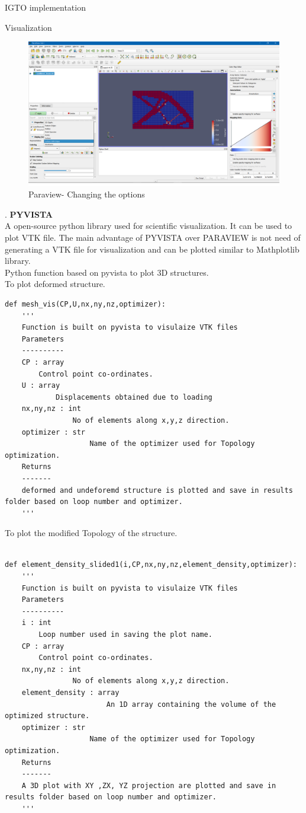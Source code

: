 \documentclass[a4paper,12pt,times]{article}
\begin{document}
\begin{section}{IGTO implementation}
\begin{subsection}{Visualization}
\begin{figure}[h!]
\centering
\includegraphics[width=0.75\linewidth]{paraview2.png}
\caption{ Paraview- Changing the options}
\label{fig:Paraview 2}
\end{figure}
.\textbf{ PYVISTA}\\
A open-source python library used for scientific visualization. It can be used to plot VTK file. The main advantage of PYVISTA over PARAVIEW is not need of generating a VTK file for visualization and can be plotted similar to Mathplotlib library.\\
Python function based on pyvista to plot 3D structures.\\
To plot deformed structure.
\begin{lstlisting}
def mesh_vis(CP,U,nx,ny,nz,optimizer):
    '''
    Function is built on pyvista to visulaize VTK files
    Parameters
    ----------
    CP : array
        Control point co-ordinates.
    U : array
            Displacements obtained due to loading
    nx,ny,nz : int
                No of elements along x,y,z direction.
    optimizer : str
                    Name of the optimizer used for Topology optimization.
    Returns
    -------
    deformed and undeforemd structure is plotted and save in results folder based on loop number and optimizer.
    '''
\end{lstlisting}
To plot the modified Topology of the structure.
\begin{lstlisting}

def element_density_slided1(i,CP,nx,ny,nz,element_density,optimizer):
    '''
    Function is built on pyvista to visulaize VTK files
    Parameters
    ----------
    i : int
        Loop number used in saving the plot name.
    CP : array
        Control point co-ordinates.
    nx,ny,nz : int
                No of elements along x,y,z direction.
    element_density : array
                        An 1D array containing the volume of the optimized structure.
    optimizer : str
                    Name of the optimizer used for Topology optimization.
    Returns
    -------
    A 3D plot with XY ,ZX, YZ projection are plotted and save in results folder based on loop number and optimizer.
    '''
\end{lstlisting}
\end{subsection}

\end{section}
\end{document}
